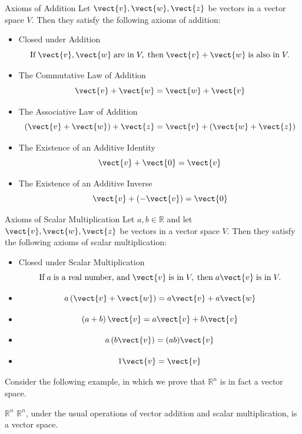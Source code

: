 \begin{definition}{Axioms of Addition}\label{def:vectorspaceaxiomsaddition}
Let $\vect{v}, \vect{w}, \vect{z}$ be vectors in a vector space $V$. Then they satisfy the following axioms of addition:

\begin{itemize}
\item Closed under Addition
\[ \mbox{If}\; \vect{v}, \vect{w} \;\mbox{are in}\; V, \;\mbox{then}\; \vect{v}+\vect{w} \;\mbox{is also in}\; V.
\] 
\item The Commutative Law of Addition
\[
\vect{v}+\vect{w}=\vect{w}+\vect{v}
\]
\item The Associative Law of Addition
\[
\left( \vect{v}+\vect{w}\right) +\vect{z}=\vect{v}+\left( \vect{w}+
\vect{z}\right) 
\]
\item The Existence of an Additive Identity
\[
\vect{v}+\vect{0}=\vect{v}
\]
\item The Existence of an Additive Inverse
\[
\vect{v}+\left( -\vect{v}\right) =\vect{0}
\]
\end{itemize}
\end{definition}

\begin{definition}{Axioms of Scalar Multiplication}\label{def:vectorspaceaxiomsscalarmult}
Let $a, b \in \mathbb{R}$ and let $\vect{v}, \vect{w}, \vect{z}$ be vectors in a vector space $V$. Then they satisfy the following axioms of scalar multiplication:

\begin{itemize}
\item Closed under Scalar Multiplication
\[ \mbox{If}\; a \;\mbox{is a real number, and}\; \vect{v} \;\mbox{is in}\; V, \;\mbox{then}\; a\vect{v} \;\mbox{is in}\; V.
\]
\item
\[
a \left( \vect{v}+\vect{w}\right) = a \vect{v}+ a \vect{w}  \label{e.01}
\]
\item
\[
\left( a + b \right) \vect{v}= a \vect{v}+ b \vect{v}
\label{e.02}
\]
\item
\[
a \left( b \vect{v}\right) = (a b) \vect{v}
\label{e.03}
\]
\item
\[
1\vect{v}=\vect{v}  \label{e.04}
\]
\end{itemize}
\end{definition}

Consider the following example, in which we prove that $\mathbb{R}^n$ is in fact a vector space.

\begin{example}{$\mathbb{R}^n$}\label{exa:Rnvectorspace}
$\mathbb{R}^n$, under the usual operations of vector addition and scalar multiplication, is a vector space.
\end{example}

